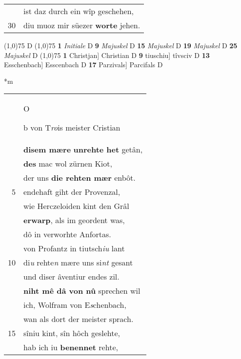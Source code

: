 \documentclass[8pt,a4paper,notitlepage]{article}
\begin{document}
\begin{table}[ht]
\begin{minipage}[t]{0.5\linewidth}
\begin{tabular}{rl}
 & ist daz durch ein wîp geschehen,\\ 
30 & diu muoz mir süezer \textbf{worte} jehen.\\ 
\end{tabular}
\scriptsize
\line(1,0){75} \newline
D \newline
\line(1,0){75} \newline
\textbf{1} \textit{Initiale} D  \textbf{9} \textit{Majuskel} D  \textbf{15} \textit{Majuskel} D  \textbf{19} \textit{Majuskel} D  \textbf{25} \textit{Majuskel} D  \newline
\line(1,0){75} \newline
\textbf{1} Christjan] Christian D \textbf{9} tiuschiu] tîvsciv D \textbf{13} Esschenbach] Esscenbach D \textbf{17} Parzivals] Parcifals D \newline
\end{minipage}
\hspace{0.5cm}
\begin{minipage}[t]{0.5\linewidth}
\small
\begin{center}*m
\end{center}
\begin{tabular}{rl}
 & \begin{large}O\end{large}b von T\textit{ro}is meister Cristian\\ 
 & \textbf{disem mære} \textbf{unrehte het} getân,\\ 
 & \textbf{des} mac wol zürnen Kiot,\\ 
 & der uns \textbf{die rehten mær} enbôt.\\ 
5 & endehaft giht der Provenzal,\\ 
 & wie Herczeloiden kint den Grâl\\ 
 & \textbf{erwarp}, als im geordent was,\\ 
 & dô in verworhte Anfortas.\\ 
 & von Profantz in tiutsch\textit{iu} lant\\ 
10 & di\textit{u} rehte\textit{n} mære uns si\textit{nt} gesant\\ 
 & und diser âventiur endes zil.\\ 
 & \textbf{niht mê dâ von nû} sprechen wil\\ 
 & ich, Wolfram von E\textit{s}chenbach,\\ 
 & wan als dort der meister sprach.\\ 
15 & sîniu kint, sîn hôch geslehte,\\ 
 & hab ich iu \textbf{benennet} rehte,\\ 

\end{tabular}
\end{minipage}
\end{table}
\end{document}
